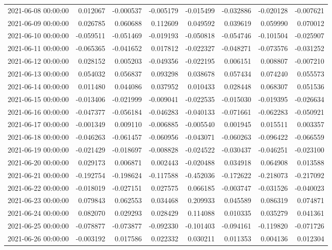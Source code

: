 \begin{tabular}{lrrrrrrr}
2021-06-08 00:00:00 & 0.012067 & -0.000537 & -0.005179 & -0.015499 & -0.032886 & -0.020128 & -0.007621 \\
2021-06-09 00:00:00 & 0.026785 & 0.060688 & 0.112609 & 0.049592 & 0.039619 & 0.059990 & 0.070012 \\
2021-06-10 00:00:00 & -0.059511 & -0.051469 & -0.019193 & -0.050818 & -0.054746 & -0.101504 & -0.025907 \\
2021-06-11 00:00:00 & -0.065365 & -0.041652 & 0.017812 & -0.022327 & -0.048271 & -0.073576 & -0.031252 \\
2021-06-12 00:00:00 & 0.028152 & 0.005203 & -0.049356 & -0.022195 & 0.006151 & 0.008807 & -0.007210 \\
2021-06-13 00:00:00 & 0.054032 & 0.056837 & 0.093298 & 0.038678 & 0.057434 & 0.074240 & 0.055573 \\
2021-06-14 00:00:00 & 0.011480 & 0.044086 & 0.037952 & 0.010433 & 0.028448 & 0.068307 & 0.051536 \\
2021-06-15 00:00:00 & -0.013406 & -0.021999 & -0.009041 & -0.022535 & -0.015030 & -0.019395 & -0.026634 \\
2021-06-16 00:00:00 & -0.047377 & -0.056184 & -0.046283 & -0.040133 & -0.071661 & -0.062283 & -0.050921 \\
2021-06-17 00:00:00 & -0.001349 & 0.009110 & -0.006885 & -0.005540 & 0.001945 & 0.015511 & 0.003357 \\
2021-06-18 00:00:00 & -0.046263 & -0.061457 & -0.060956 & -0.043071 & -0.060263 & -0.096422 & -0.066559 \\
2021-06-19 00:00:00 & -0.021429 & -0.018697 & -0.008828 & -0.024522 & -0.030437 & -0.046251 & -0.023100 \\
2021-06-20 00:00:00 & 0.029173 & 0.006871 & 0.002443 & -0.020488 & 0.034918 & 0.064908 & 0.013588 \\
2021-06-21 00:00:00 & -0.192754 & -0.198624 & -0.117588 & -0.452036 & -0.172622 & -0.218073 & -0.217092 \\
2021-06-22 00:00:00 & -0.018019 & -0.027151 & 0.027575 & 0.066185 & -0.003747 & -0.031526 & -0.040023 \\
2021-06-23 00:00:00 & 0.079843 & 0.062553 & 0.034468 & 0.209933 & 0.045589 & 0.086319 & 0.074871 \\
2021-06-24 00:00:00 & 0.082070 & 0.029293 & 0.028429 & 0.114088 & 0.010335 & 0.035279 & 0.041361 \\
2021-06-25 00:00:00 & -0.078877 & -0.073877 & -0.092330 & -0.101403 & -0.094161 & -0.119820 & -0.071726 \\
2021-06-26 00:00:00 & -0.003192 & 0.017586 & 0.022332 & 0.030211 & 0.011353 & 0.004136 & 0.012304 \\

\end{tabular}
